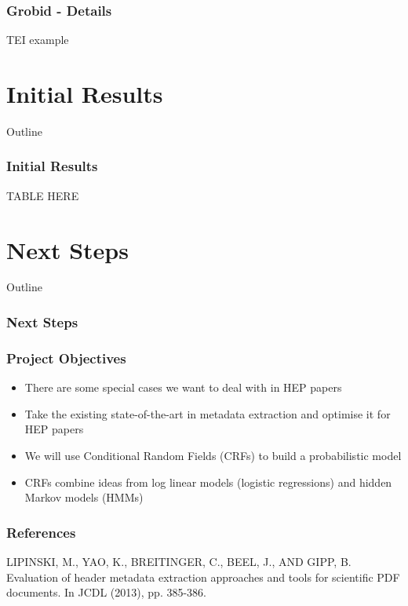\documentclass{beamer}
\begin{document}

\begin{frame}
\frametitle{Grobid - Details}
TEI example
\end{frame}


\section{Initial Results}
\begin{frame}[noframenumbering]{Outline}
\tableofcontents[currentsection]
\end{frame}


\begin{frame}
\frametitle{Initial Results}
TABLE HERE
\end{frame}


\section{Next Steps}
\begin{frame}[noframenumbering]{Outline}
\tableofcontents[currentsection]
\end{frame}


\begin{frame}
\frametitle{Next Steps}
\end{frame}


\begin{frame}
\frametitle{Project Objectives}
\begin{itemize}
\item There are some special cases we want to deal with in HEP papers
\item Take the existing state-of-the-art in metadata extraction and optimise it for HEP papers
\item We will use Conditional Random Fields (CRFs) to build a probabilistic model
\item CRFs combine ideas from log linear models (logistic regressions) and hidden Markov models (HMMs)
\end{itemize}
\end{frame}


\begin{frame}
\frametitle{References}

\begin{thebibliography}{0}

 LIPINSKI, M., YAO, K., BREITINGER, C., BEEL, J., AND GIPP, B. Evaluation of header metadata extraction approaches and tools for scientific PDF documents. In JCDL (2013), pp. 385-386.

\end{thebibliography}

\end{frame}
\end{document}
